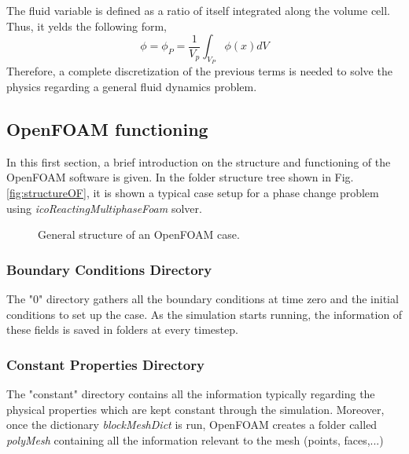 The fluid variable is defined as a ratio of itself integrated along the volume cell. Thus, it yelds the following form,
\begin{equation}
\phi=\phi_{P}=\frac{1}{V_{p}} \int_{V_{P}} \phi(x) d V
\label{3.2}
\end{equation}
Therefore, a complete discretization of the previous terms is needed to solve the physics regarding a general fluid dynamics problem.
\subsection{OpenFOAM functioning}
In this first section, a brief introduction on the structure and functioning of the OpenFOAM software is given.
In the folder structure tree shown in Fig. \ref{fig:structureOF}, it is shown a typical case setup for a phase change problem using \textit{icoReactingMultiphaseFoam} solver.
\clearpage
\begin{figure}[h!]
	\centering
	\label{3.1fig}
	\caption{General structure of an OpenFOAM case.}
\end{figure}

\subsubsection{Boundary Conditions Directory}
The "0" directory gathers all the boundary conditions at time zero and the initial conditions to set up the case. As the simulation starts running, the information of these fields is saved in folders at every timestep.
\subsubsection{Constant Properties Directory}
The "constant" directory contains all the information typically regarding the physical properties which are kept constant through the simulation. Moreover, once the dictionary \textit{blockMeshDict} is run, OpenFOAM creates a folder called \textit{polyMesh} containing all the information relevant to the mesh (points, faces,...) 

